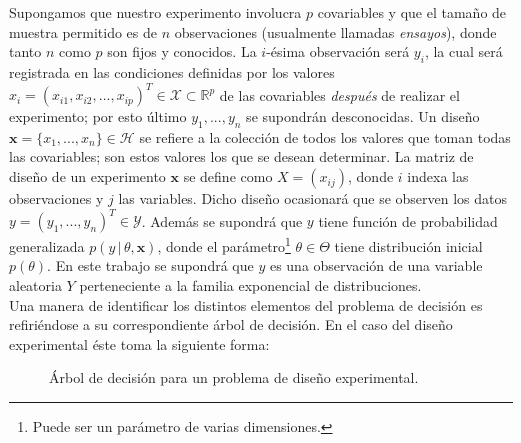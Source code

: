 Supongamos que nuestro experimento involucra $p$ covariables y que el tamaño de muestra permitido es de $n$ observaciones (usualmente llamadas \textit{ensayos}), donde tanto $n$ como $p$ son fijos y conocidos. La $i$-ésima observación será $y_i$, la cual será registrada en las condiciones definidas por los valores $x_i = (x_{i1}, x_{i2}, ..., x_{ip})^T \in \mathcal{X} \subset \mathbb{R}^p$ de las covariables \textit{después} de realizar el experimento; por esto último $y_1, ..., y_n$ se supondrán desconocidas. Un diseño $\mathbf{x} = \{ x_1, ..., x_n \} \in \mathcal{H}$ se refiere a la colección de todos los valores que toman todas las covariables; son estos valores los que se desean determinar. La matriz de diseño de un experimento $\mathbf{x}$ se define como $X = (x_{ij})$, donde $i$ indexa las observaciones y $j$ las variables. Dicho diseño ocasionará que se observen los datos $y = (y_1, ..., y_n)^T \in \mathcal{Y}$. Además se supondrá que $y$ tiene función de probabilidad generalizada $p(y \, | \, \theta, \mathbf{x} )$, donde el parámetro\footnote{Puede ser un parámetro de varias dimensiones.} $\theta \in \Theta$ tiene distribución inicial $p(\theta)$. En este trabajo se supondrá que $y$ es una observación de una variable aleatoria $Y$ perteneciente a la familia exponencial de distribuciones. \\


Una manera de identificar los distintos elementos del problema de decisión es refiriéndose a su correspondiente árbol de decisión. En el caso del diseño experimental éste toma la siguiente forma:

\begin{figure}[H]
\centering
{}
\caption{Árbol de decisión para un problema de diseño experimental.}
\label{dt:dox}
\end{figure}


